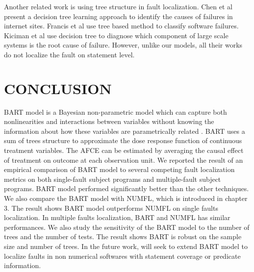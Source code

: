 Another related work is using tree structure in fault localization. Chen et al \cite{} present a decision tree learning approach to identify the causes of failures in internet sites. Francis et al \cite{} use tree based method to classify software failures. Kiciman et al \cite{} use decision tree to diagnose which component of large scale systems is the root cause of failure. However, unlike our models, all their works do not localize the fault on statement level.

\section{CONCLUSION}\label{BARTconclusion}
BART model is a Bayesian non-parametric model which can capture both nonlinearities and interactions between variables without knowing the information about how these variables are parametrically related . BART uses a sum of trees structure to approximate the dose response function of continuous treatment variables. The AFCE can be estimated by averaging the causal effect of treatment on outcome at each observation unit. We reported the result of an empirical comparison of BART model to several competing fault localization metrics on both single-fault subject programs and multiple-fault subject programs. BART model performed significantly better than the other techniques. We also compare the BART model with NUMFL, which is introduced in chapter 3. The result shows BART model outperforms NUMFL on single faults localization. In multiple faults localization, BART and NUMFL has similar performances.  We also study the sensitivity of the BART model to the number of trees and the number of tests. The result shows BART is robust on the sample size and number of trees.  In the future work, will seek to extend BART model to localize faults in non numerical softwares with statement coverage or predicate information. 